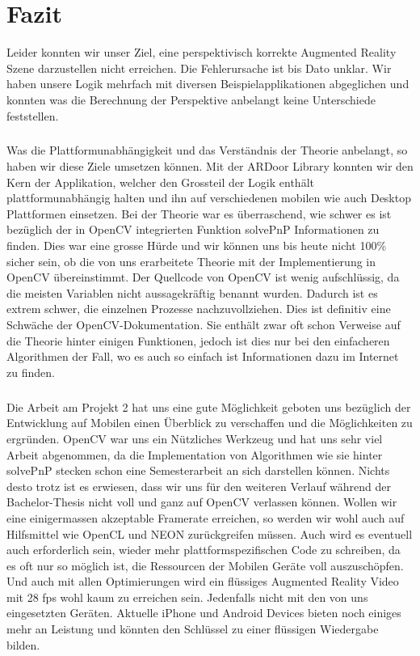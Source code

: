 \chapter{Fazit}

Leider konnten wir unser Ziel, eine perspektivisch korrekte Augmented Reality Szene darzustellen nicht erreichen. Die Fehlerursache ist bis Dato unklar. Wir haben unsere Logik mehrfach mit diversen Beispielapplikationen abgeglichen und konnten was die Berechnung der Perspektive anbelangt keine Unterschiede feststellen. 
\paragraph{}
Was die Plattformunabhängigkeit und das Verständnis der Theorie anbelangt, so haben wir diese Ziele umsetzen können. Mit der ARDoor Library konnten wir den Kern der Applikation, welcher den Grossteil der Logik enthält plattformunabhängig halten und ihn auf verschiedenen mobilen wie auch Desktop Plattformen einsetzen. Bei der Theorie war es überraschend, wie schwer es ist bezüglich der in OpenCV integrierten Funktion solvePnP Informationen zu finden. Dies war eine grosse Hürde und wir können uns bis heute nicht 100\% sicher sein, ob die von uns erarbeitete Theorie mit der Implementierung in OpenCV übereinstimmt. Der Quellcode von OpenCV ist wenig aufschlüssig, da die meisten Variablen nicht aussagekräftig benannt wurden. Dadurch ist es extrem schwer, die einzelnen Prozesse nachzuvollziehen. Dies ist definitiv eine Schwäche der OpenCV-Dokumentation. Sie enthält zwar oft schon Verweise auf die Theorie hinter einigen Funktionen, jedoch ist dies nur bei den einfacheren Algorithmen der Fall, wo es auch so einfach ist Informationen dazu im Internet zu finden.
\paragraph{}
Die Arbeit am Projekt 2 hat uns eine gute Möglichkeit geboten uns bezüglich der Entwicklung auf Mobilen einen Überblick zu verschaffen und die Möglichkeiten zu ergründen. OpenCV war uns ein Nützliches Werkzeug und hat uns sehr viel Arbeit abgenommen, da die Implementation von Algorithmen wie sie hinter solvePnP stecken schon eine Semesterarbeit an sich darstellen können. Nichts desto trotz ist es erwiesen, dass wir uns für den weiteren Verlauf während der Bachelor-Thesis nicht voll und ganz auf OpenCV verlassen können. Wollen wir eine einigermassen akzeptable Framerate erreichen, so werden wir wohl auch auf Hilfsmittel wie OpenCL und NEON zurückgreifen müssen. Auch wird es eventuell auch erforderlich sein, wieder mehr plattformspezifischen Code zu schreiben, da es oft nur so möglich ist, die Ressourcen der Mobilen Geräte voll auszuschöpfen. Und auch mit allen Optimierungen wird ein flüssiges Augmented Reality Video mit 28 fps wohl kaum zu erreichen sein. Jedenfalls nicht mit den von uns eingesetzten Geräten. Aktuelle iPhone und Android Devices bieten noch einiges mehr an Leistung und könnten den Schlüssel zu einer flüssigen Wiedergabe bilden.
